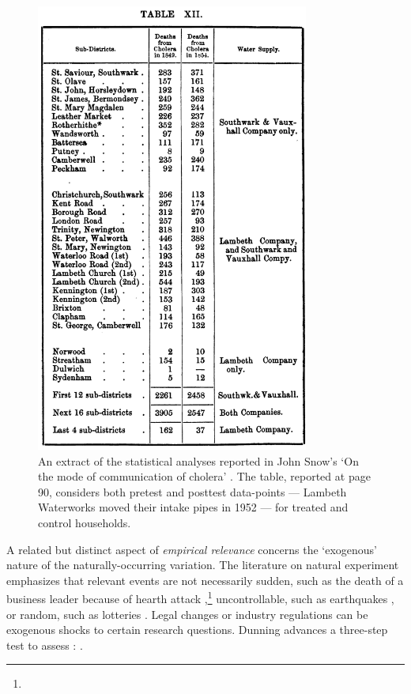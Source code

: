 \begin{refsection}
\begin{figure}
  \begin{small}
    \begin{center}
      \includegraphics[width=0.8\textwidth]{exhibits/snow_natural_experiment.png}
    \end{center}
    \caption{An extract of the statistical analyses reported in John Snow's 
    `On the mode of communication of cholera' \parencite*{snow_1855}. The table,
    reported at page 90, considers both pretest and posttest data-points ---
    Lambeth Waterworks moved their intake pipes in 1952 --- for treated 
    and control households.}
    \label{fig:snow_natural_experiment}
  \end{small}
\end{figure}

A related but distinct aspect of \textit{empirical relevance} concerns the
`exogenous' nature of the naturally-occurring variation. The literature on
natural experiment emphasizes that relevant events are not necessarily sudden,
such as the death of a business leader because of hearth attack
\parencite[e.g.,][]{nguyen_et_al_2010},\footnote{} uncontrollable, such as earthquakes 
\parencite[e.g.,][]{belloc_et_al_2016}, or random, such as lotteries \parencite[e.g.][]{poulos_2019}. 
Legal changes or industry regulations can be exogenous shocks to certain
research questions. Dunning advances a three-step test to assess : .


\end{refsection}
